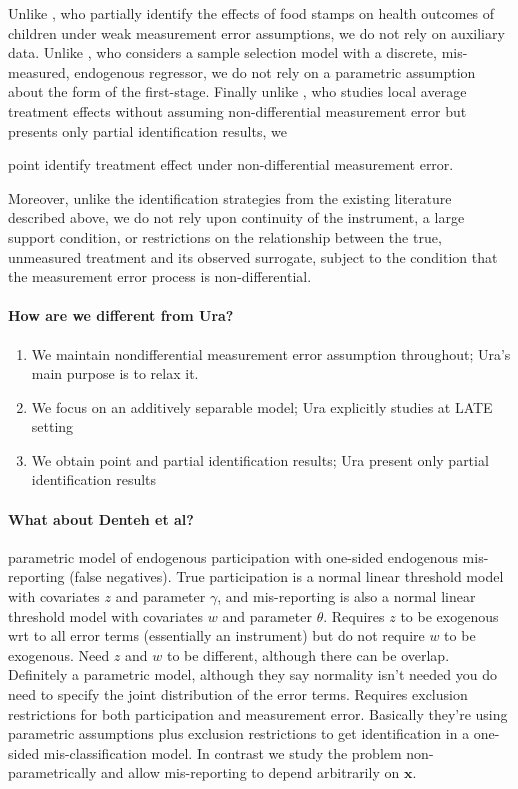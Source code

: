
Unlike \cite{kreider2012}, who partially identify the effects of food stamps on health outcomes of children under weak measurement error assumptions, we do not rely on auxiliary data. 
Unlike \cite{shiu2015}, who considers a sample selection model with a discrete, mis-measured, endogenous regressor, we do not rely on a parametric assumption about the form of the first-stage.
Finally unlike \cite{Ura}, who studies local average treatment effects without assuming non-differential measurement error but presents only partial identification results, we 

point identify treatment effect under non-differential measurement error.

Moreover, unlike the identification strategies from the existing literature described above, we do not rely upon continuity of the instrument, a large support condition, or restrictions on the relationship between the true, unmeasured treatment and its observed surrogate, subject to the condition that the measurement error process is non-differential.


\paragraph{How are we different from Ura?}
\begin{enumerate}
  \item We maintain nondifferential measurement error assumption throughout; Ura's main purpose is to relax it.
  \item We focus on an additively separable model; Ura explicitly studies at LATE setting
  \item We obtain point and partial identification results; Ura present only partial identification results
\end{enumerate}

\paragraph{What about Denteh et al?}
\cite{nguimkeu2016estimation} parametric model of endogenous participation with one-sided endogenous mis-reporting (false negatives).
True participation is a normal linear threshold model with covariates $z$ and parameter $\gamma$, and mis-reporting is also a normal linear threshold model with covariates $w$ and parameter $\theta$.
Requires $z$ to be exogenous wrt to all error terms (essentially an instrument) but do not require $w$ to be exogenous.
Need $z$ and $w$ to be different, although there can be overlap.
Definitely a parametric model, although they say normality isn't needed you do need to specify the joint distribution of the error terms.
Requires exclusion restrictions for both participation and measurement error.
Basically they're using parametric assumptions plus exclusion restrictions to get identification in a one-sided mis-classification model.
In contrast we study the problem non-parametrically and allow mis-reporting to depend arbitrarily on $\mathbf{x}$.

